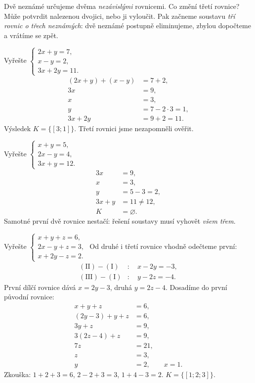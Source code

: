 \documentclass[11pt,a4paper]{article}
\begin{document}
Dvě neznámé určujeme dvěma \emph{nezávislými} rovnicemi. Co změní třetí rovnice? Může potvrdit nalezenou dvojici, nebo ji vyloučit. Pak začneme soustavu \emph{tří rovnic o třech neznámých}: dvě neznámé postupně eliminujeme, zbylou dopočteme a vrátíme se zpět.
\begin{prikladReseniBox}[title={Příklad 1}]
Vyřešte $\begin{cases}2x+y=7,\\x-y=2,\\3x+2y=11.\end{cases}$
\tcblower
\begin{align*}
(2x+y)+(x-y)&=7+2,\\
3x&=9,\\
x&=3,\\
y&=7-2\cdot3=1,\\
3x+2y&=9+2=11.
\end{align*}
Výsledek $K=\{[3;1]\}$. Třetí rovnici jsme nezapomněli ověřit.
\end{prikladReseniBox}
\begin{prikladReseniBox}[title={Příklad 2}]
Vyřešte $\begin{cases}x+y=5,\\2x-y=4,\\3x+y=12.\end{cases}$
\tcblower
\begin{align*}
3x&=9,\\
x&=3,\\
y&=5-3=2,\\
3x+y&=11\ne12,\\
K&=\varnothing.
\end{align*}
Samotné první dvě rovnice nestačí: řešení soustavy musí vyhovět \emph{všem třem}.
\end{prikladReseniBox}
\begin{prikladReseniBox}[title={Příklad 3}]
Vyřešte $\begin{cases}x+y+z=6,\\2x-y+z=3,\\x+2y-z=2.\end{cases}$
\tcblower
Od druhé i třetí rovnice vhodně odečteme první:
\begin{align*}
(\mathrm{II})-(\mathrm{I})&:\quad x-2y=-3,\\
(\mathrm{III})-(\mathrm{I})&:\quad y-2z=-4.
\end{align*}
První dílčí rovnice dává $x=2y-3$, druhá $y=2z-4$. Dosadíme do první původní rovnice:
\begin{align*}
x+y+z&=6,\\
(2y-3)+y+z&=6,\\
3y+z&=9,\\
3(2z-4)+z&=9,\\
7z&=21,\\
z&=3,\\
y&=2,\qquad x=1.
\end{align*}
Zkouška: $1+2+3=6$, $2-2+3=3$, $1+4-3=2$. $K=\{[1;2;3]\}$.
\end{prikladReseniBox}
\end{document}
